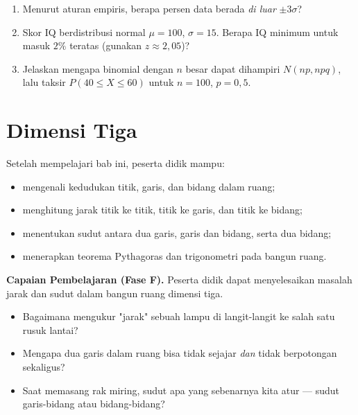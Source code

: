 \documentclass[11pt,a4paper]{report}
\theoremstyle{gaya}
\begin{document}
\begin{challenge}
\begin{enumerate}[leftmargin=*,topsep=2pt]
  \item Menurut aturan empiris, berapa persen data berada \emph{di luar} $\pm3\sigma$?
  \item Skor IQ berdistribusi normal $\mu=100$, $\sigma=15$. Berapa IQ minimum untuk masuk $2\%$ teratas (gunakan $z\approx2{,}05$)?
  \item Jelaskan mengapa binomial dengan $n$ besar dapat dihampiri $N(np,npq)$, lalu taksir $P(40\le X\le60)$ untuk $n=100$, $p=0{,}5$.
\end{enumerate}
\end{challenge}

\chapter{Dimensi Tiga}
\begin{tujuan}
Setelah mempelajari bab ini, peserta didik mampu:
\begin{itemize}[leftmargin=*,topsep=2pt]
  \item mengenali kedudukan titik, garis, dan bidang dalam ruang;
  \item menghitung jarak titik ke titik, titik ke garis, dan titik ke bidang;
  \item menentukan sudut antara dua garis, garis dan bidang, serta dua bidang;
  \item menerapkan teorema Pythagoras dan trigonometri pada bangun ruang.
\end{itemize}
\textbf{Capaian Pembelajaran (Fase F).} Peserta didik dapat menyelesaikan masalah jarak dan sudut dalam bangun ruang dimensi tiga.
\end{tujuan}

\begin{pemantik}
\begin{itemize}[leftmargin=*,topsep=2pt]
  \item Bagaimana mengukur "jarak" sebuah lampu di langit-langit ke salah satu rusuk lantai?
  \item Mengapa dua garis dalam ruang bisa tidak sejajar \emph{dan} tidak berpotongan sekaligus?
  \item Saat memasang rak miring, sudut apa yang sebenarnya kita atur --- sudut garis-bidang atau bidang-bidang?
\end{itemize}
\end{pemantik}
\end{document}
